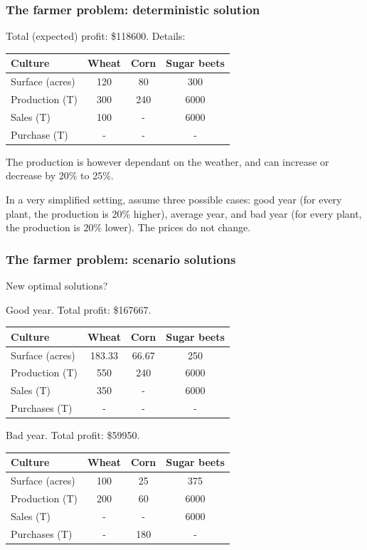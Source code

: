 \documentclass{beamer}
\def\blue{\color{blue}}
\def\red{\color{red}}
\begin{document}
\begin{frame}
\frametitle{The farmer problem: deterministic solution}

Total (expected) profit: \$118600. Details:
\begin{center}
\begin{tabular}{lccc}
\hline
Culture & Wheat & Corn & Sugar beets \\
\hline
Surface (acres) & 120 & 80 & 300 \\
Production (T) & 300 & 240 & 6000 \\
Sales (T) & 100 & - & 6000 \\
Purchase (T) & - & - & - \\
\hline
\end{tabular}
\end{center}

\mbox{}

The production is however dependant on the weather, and can increase or decrease by 20\% to 25\%.

\mbox{}

In a very simplified setting, assume three possible cases: good year (for every plant, the production is 20\% higher), average year, and bad year (for every plant, the production is 20\% lower).
The prices do not change.
\end{frame}

\begin{frame}
\frametitle{The farmer problem: scenario solutions}

{\blue New optimal solutions?}

\mbox{}

{\red Good year}. Total profit: \$167667.
\begin{center}
\begin{tabular}{lccc}
\hline
Culture & Wheat & Corn & Sugar beets \\
\hline
Surface (acres) & 183.33 & 66.67 & 250 \\
Production (T) & 550 & 240 & 6000 \\
Sales (T) & 350 & - & 6000 \\
Purchases (T) & - & - & - \\
\hline
\end{tabular}
\end{center}

\mbox{}

\mbox{}

{\red Bad year}. Total profit: \$59950.
\begin{center}
\begin{tabular}{lccc}
\hline
Culture & Wheat & Corn & Sugar beets \\
\hline
Surface (acres) & 100 & 25 & 375 \\
Production (T) & 200 & 60 & 6000 \\
Sales (T) & - & - & 6000 \\
Purchases (T) & - & 180 & - \\
\hline
\end{tabular}
\end{center}

\end{frame}
\end{document}
